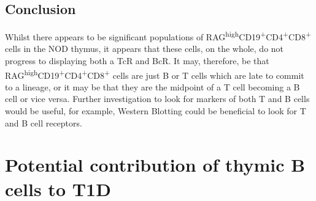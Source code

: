 









\subsection{Conclusion}

Whilst there appears to be significant populations of RAG\textsuperscript{high}CD19\textsuperscript{+}CD4\textsuperscript{+}CD8\textsuperscript{+} cells in the NOD thymus, it appears that these cells, on the whole, do not progress to displaying both a TcR and BcR.
It may, therefore, be that RAG\textsuperscript{high}CD19\textsuperscript{+}CD4\textsuperscript{+}CD8\textsuperscript{+} cells are just B or T cells which are late to commit to a lineage, or it may be that they are the midpoint of a T cell becoming a B cell or vice versa.
Further investigation to look for markers of both T and B cells would be useful, for example, Western Blotting could be beneficial to look for T and B cell receptors.

\section{Potential contribution of thymic B cells to T1D}

